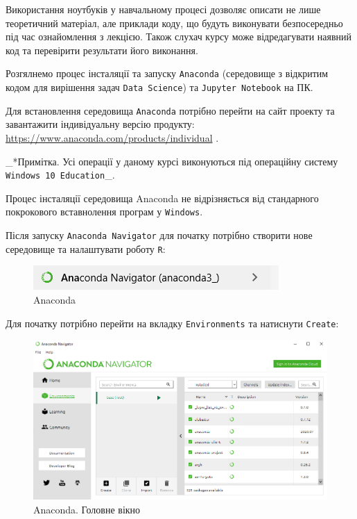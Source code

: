 \documentclass[
]{book}
\begin{document}
Використання ноутбуків у навчальному процесі дозволяє описати не лише теоретичний матеріал, але приклади коду, що будуть виконувати безпосередньо під час ознайомлення з лекцією. Також слухач курсу може відредагувати наявний код та перевірити результати його виконання.

Розгялнемо процес інсталяції та запуску \texttt{Anaconda} (середовище з відкритим кодом для вирішення задач \texttt{Data\ Science}) та \texttt{Jupyter\ Notebook} на ПК.

Для встановлення середовища \texttt{Anaconda} потрібно перейти на сайт проекту та завантажити індивідуальну версію продукту: \url{https://www.anaconda.com/products/individual} \citep{Anaconda-site}.

\_*Примітка. Усі операції у даному курсі виконуються під операційну систему \texttt{Windows\ 10\ Education}\_.

Процес інсталяції середовища Anaconda не відрізняється від стандарного покрокового вставнолення програм у \texttt{Windows}.

Після запуску \texttt{Anaconda\ Navigator} для початку потрібно створити нове середовище та налаштувати роботу \texttt{R}:

\begin{figure}
\centering
\includegraphics{images/chapter1/anaconda_1.png}
\caption{Anaconda}
\end{figure}

Для початку потрібно перейти на вкладку \texttt{Environments} та натиснути \texttt{Create}:

\begin{figure}
\centering
\includegraphics{images/chapter1/anaconda_2.png}
\caption{\label{fig:unnamed-chunk-24}Anaconda. Головне вікно}
\end{figure}
\end{document}
